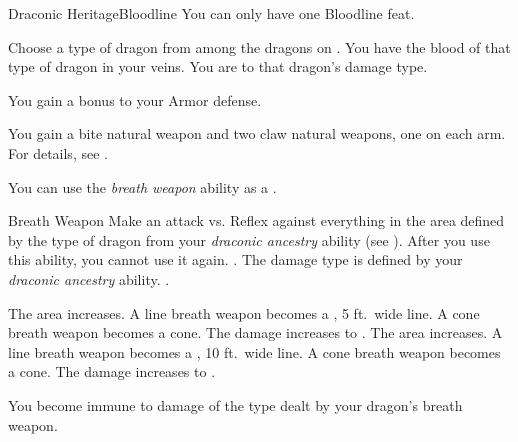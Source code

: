     \begin{feat}{Draconic Heritage}{Bloodline}
         You can only have one Bloodline feat.

         Choose a type of dragon from among the dragons on .
        You have the blood of that type of dragon in your veins.
        You are  to that dragon's damage type.

         You gain a  bonus to your Armor defense.

         You gain a bite natural weapon and two claw natural weapons, one on each arm.
        For details, see .

         You can use the \textit{breath weapon} ability as a .
        \begin{activeability}{Breath Weapon}
            \rankline
            Make an attack vs. Reflex against everything in the area defined by the type of dragon from your \textit{draconic ancestry} ability (see ).
            After you use this ability, you  cannot use it again.
            \hit \damagerankthree{}.
            The damage type is defined by your \textit{draconic ancestry} ability.
            \miss {}.

            \rankline
             The area increases.
                A line breath weapon becomes a \arealarge, 5 ft.\ wide line.
                A cone breath weapon becomes a \areamed cone.
             The damage increases to \damagerankfive{}.
             The area increases.
                A line breath weapon becomes a \areahuge, 10 ft.\ wide line.
                A cone breath weapon becomes a \arealarge cone.
             The damage increases to \damagerankseven{}.
        \end{activeability}

         You become immune to damage of the type dealt by your dragon's breath weapon.


\end{feat}
